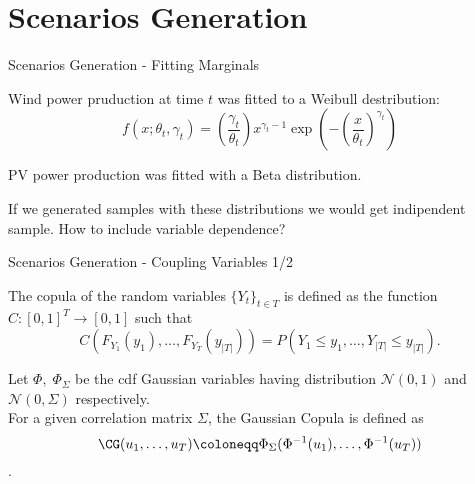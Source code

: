 
\section{Scenarios Generation }

\begin{frame}{Scenarios Generation - Fitting Marginals}

Wind power pruduction at time  \(t\) was fitted to a Weibull destribution:
\[
f(x; \theta_t, \gamma_t) = \left(\frac{\gamma_t}{\theta_t}\right)x^{\gamma_t-1}\exp\left(-\left(\frac{x}{\theta_t}\right)^{\gamma_t}\right)
\]

PV power production was fitted with a Beta distribution.

If we generated samples with these distributions we would get indipendent sample. How to include variable dependence?
\end{frame}
\begin{frame}{Scenarios Generation - Coupling Variables 1/2}

\begin{definition}
    The copula of the random variables \(\{Y_t\}_{t \in T}\) is defined as the function \(C: [0,1]^T \to [0,1]\) such that 
    \begin{equation}
    C(F_{Y_1}(y_1), \ldots, F_{Y_T}(y_{|T|})) = P(Y_1 \leq y_1, \ldots, Y_{|T|} \leq y_{|T|}).
    \end{equation}
\end{definition}

\begin{definition}
  Let  \(\Phi,\; \Phi_{\Sigma}\) be the cdf Gaussian variables having distribution \(\mathcal{N}(0,1)\) and \( \mathcal{N}(0,\Sigma)\) respectively. \\
  For a given correlation matrix \(\Sigma\), the Gaussian Copula is defined as \[\CG(u_1,\ldots,u_{T}) \coloneqq \Phi_{\Sigma}(\Phi^{-1}(u_1),\ldots, \Phi^{-1}(u_T))\].
\end{definition}
\vspace{0.5cm}

\vspace{0.5cm}

\end{frame}
